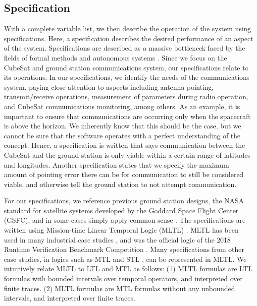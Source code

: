 \documentclass[conf]{new-aiaa}
\begin{document}
\subsection{Specification}

With a complete variable list, we then describe the operation of the system using specifications. Here, a specification describes the desired performance of an aspect of the system. Specifications are described as a massive bottleneck faced by the fields of formal methods and autonomous systems \cite{Roz16}. Since we focus on the CubeSat and ground station communications system, our specifications relate to its operations. In our specifications, we identify the needs of the communications system, paying close attention to aspects including antenna pointing, transmit/receive operations, measurement of parameters during radio operation, and CubeSat communications monitoring, among others. As an example, it is important to ensure that communications are occurring only when the spacecraft is above the horizon. We inherently know that this should be the case, but we cannot be sure that the software operates with a perfect understanding of the concept. Hence, a specification is written that says communication between the CubeSat and the ground station is only viable within a certain range of latitudes and longitudes. Another specification states that we specify the maximum amount of pointing error there can be for communication to still be considered viable, and otherwise tell the ground station to not attempt communication.

For our specifications, we reference previous ground station designs, the NASA standard for satellite systems developed by the Goddard Space Flight Center (GSFC), and in some cases simply apply common sense \cite{choi2017,Asundi2013,Goddard}. The specifications are written using Mission-time Linear Temporal Logic (MLTL) \cite{RRS14,LVR19}. MLTL has been used in many industrial case studies \cite{RRS14,GRS14,SRRMMI15,RSI15,SMR15,SMR16,MRS17}, and was the official logic of the 2018 Runtime Verification Benchmark Competition \cite{RVBC2018}. Many specifications from other case studies, in logics such as MTL \cite{AH90} and STL \cite{MN04}, can be represented in MLTL. We intuitively relate MLTL to LTL and MTL as follows: (1) MLTL formulas are LTL formulas with bounded intervals over temporal operators, and interpreted over finite traces. (2) MLTL formulas are MTL formulas without any unbounded intervals, and interpreted over finite traces.
\end{document}
